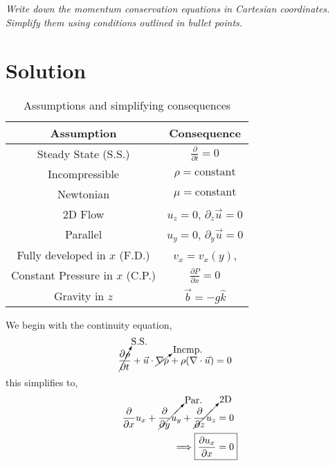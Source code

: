 
\section{}
\textit{Write down the momentum conservation equations in Cartesian coordinates. Simplify them using conditions outlined in bullet points.}
\section*{Solution}
\begin{table}[h]
    \centering
    \caption{Assumptions and simplifying consequences}
    \begin{tabular}{cc}
        \hline
        \textbf{Assumption} & \textbf{Consequence} \\
        \hline
        Steady State (S.S.) & $\frac{\partial}{\partial t} = 0$ \\
        Incompressible & $\rho = \text{constant}$ \\
        Newtonian & $\mu = \text{constant}$ \\
        2D Flow & $u_z = 0$, $\partial_z \vec{u} = 0$ \\
        Parallel & $u_y = 0$, $\partial_y \vec{u} = 0$ \\
        Fully developed in $x$ (F.D.) & $v_x = v_x(y)$, \\
        Constant Pressure in $x$ (C.P.) & $\frac{\partial P}{\partial x} = 0$ \\
        Gravity in $z$ & $\vec{b} = -g \hat{k}$ \\
        \hline
    \end{tabular}
    \label{tab:Q2assumptions}
\end{table}
\FloatBarrier
We begin with the continuity equation,
\begin{align*}
    \cancelto{\text{S.S.}}{\frac{\partial \rho}{\partial t}} + \vec{u} \cdot \cancelto{\text{Incmp.}}{ \nabla \rho} +\rho (\nabla \cdot \vec{u}) &= 0
\end{align*}
this simplifies to,
\begin{align*}
    \frac{\partial}{\partial x} u_x + \cancelto{\text{Par.}}{\frac{\partial}{\partial y} u_y} + \cancelto{\text{2D}}{\frac{\partial}{\partial z} u_z} &= 0 \\
    \implies \Aboxed{\frac{\partial u_x}{\partial x} &= 0}
\end{align*}
